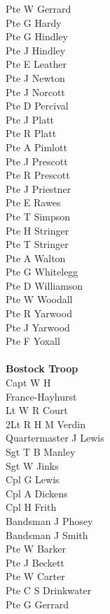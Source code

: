 \begin{multicols}{3}
  Pte W Gerrard \\
  Pte G Hardy \\
  Pte G Hindley \\
  Pte J Hindley \\
  Pte E Leather \\
  Pte J Newton \\
  Pte J Norcott \\
  Pte D Percival \\
  Pte J Platt \\
  Pte R Platt \\
  Pte A Pimlott \\
  Pte J Prescott \\
  Pte R Prescott \\
  Pte J Priestner \\
  Pte E Rawes \\
  Pte T Simpson \\
  Pte H Stringer \\
  Pte T Stringer \\
  Pte A Walton \\
  Pte G Whitelegg \\
  Pte D Williamson \\
  Pte W Woodall \\
  Pte R Yarwood \\
  Pte J Yarwood \\
  Pte F Yoxall \\
  \\
  \textbf{Bostock Troop} \\
  Capt W H \\ \indent France-Hayhurst \\
  Lt W R Court \\
  2Lt R H M Verdin \\
  Quartermaster J Lewis \\
  Sgt T B Manley \\
  Sgt W Jinks \\
  Cpl G Lewis \\
  Cpl A Dickens \\
  Cpl H Frith \\
  Bandsman J Phosey \\
  Bandsman J Smith \\
  Pte W Barker \\
  Pte J Beckett \\
  Pte W Carter \\
  Pte C S Drinkwater \\
  Pte G Gerrard \\

\end{multicols}
